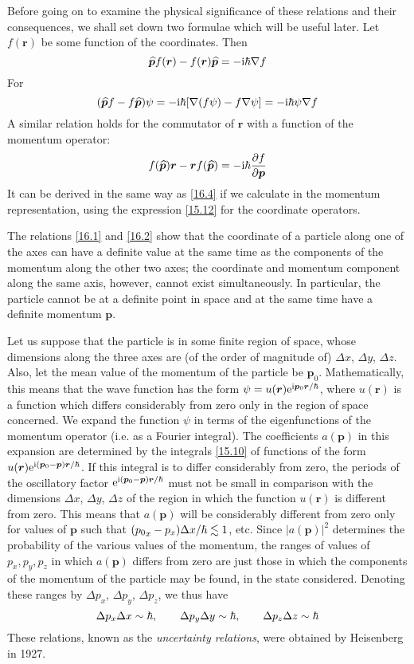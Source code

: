 Before going on to examine the physical significance of these relations and their consequences, we shall set down two formulae which will be useful later. Let $ f (\bm{r}) $ be some function of the coordinates. Then
\begin{equation}\label{16.4}
\widehat{\bm{p}}f(\bm{r})-f(\bm{r})\widehat{\bm{p}}=-\mathrm{i}\hbar\nabla f
\end{equation}
For
\[ (\widehat{\bm{p}}f-f\widehat{\bm{p}})\psi=-\mathrm{i}\hbar[\nabla(f\psi)-f\nabla\psi]=-\mathrm{i}\hbar\psi\nabla f \]
A similar relation holds for the commutator of $ \bm{r} $ with a function of the momentum operator:
\begin{equation}\label{16.5}
f(\widehat{\bm{p}})\bm{r}-\bm{r}f(\widehat{\bm{p}})=-\mathrm{i}\hbar\frac{\partial f}{\partial\bm{p}}
\end{equation}
It can be derived in the same way as \eqref{16.4} if we calculate in the momentum representation, using the expression \eqref{15.12} for the coordinate operators.

The relations \eqref{16.1} and \eqref{16.2} show that the coordinate of a particle along one of the axes can have a definite value at the same time as the components of the momentum along the other two axes; the coordinate and momentum component along the same axis, however, cannot exist simultaneously. In particular, the particle cannot be at a definite point in space and at the same time have a definite momentum $ \bm{p} $.

Let us suppose that the particle is in some finite region of space, whose dimensions along the three axes are (of the order of magnitude of) $\Delta x$, $ \Delta y $, $ \Delta z $. Also, let the mean value of the momentum of the particle be $ \bm{p}_0 $. Mathematically, this means that the wave function has the form $ \psi = u(\bm{r})\mathrm{e}^{\mathrm{i}\bm{p}_0\bm{r}/\hbar} $, where $ u (\bm{r}) $ is a function which differs considerably from zero only in the region of space concerned. We expand the function $\psi$ in terms of the eigenfunctions of the momentum operator (i.e. as a Fourier integral). The coefficients $ a (\bm{p}) $ in this expansion are determined by the integrals \eqref{15.10} of functions of the form $ u(\bm{r})\mathrm{e}^{\mathrm{i}(\bm{p}_0-\bm{p})\bm{r}/\hbar} $. If this integral is to differ considerably from zero, the periods of the oscillatory factor $ \mathrm{e}^{\mathrm{i}(\bm{p}_0-\bm{p})\bm{r}/\hbar} $ must not be small in comparison with the dimensions $\Delta x$, $ \Delta y $, $ \Delta z $ of the region in which the function $ u(\bm{r}) $ is different from zero. This means that $ a (\bm{p}) $ will be considerably different from zero only for values of $ \bm{p} $ such that $ ({p_{0}}_x-p_x)\Delta x/\hbar \lesssim 1 $, etc. Since $ |a(\bm{p})|^2 $ determines the probability of the various values of the momentum, the ranges of values of $ p_x, p_y, p_z $ in which $ a(\bm{p}) $ differs from zero are just those in which the components of the momentum of the particle may be found, in the state considered. Denoting these ranges by $ \Delta p_x$, $\Delta p_y$, $\Delta p_z$, we thus have
\begin{equation}\label{16.6}
\Delta p_x\Delta x\sim\hbar,\qquad\Delta p_y\Delta y\sim\hbar,\qquad\Delta p_z\Delta z\sim\hbar
\end{equation}
These relations, known as the \textit{uncertainty relations}, were obtained by Heisenberg in 1927.

